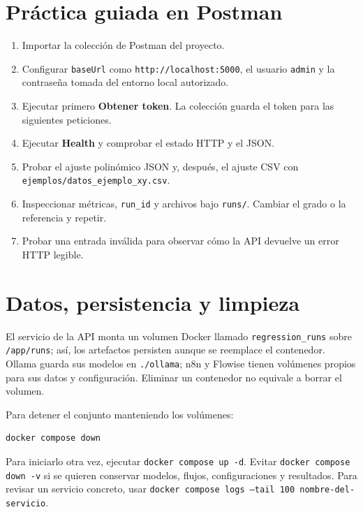 \documentclass[11pt,a4paper]{article}
\begin{document}
\section{Práctica guiada en Postman}
\begin{enumerate}
\item Importar la colección de Postman del proyecto.
\item Configurar \texttt{baseUrl} como \texttt{http://localhost:5000}, el usuario \texttt{admin} y la contraseña tomada del entorno local autorizado.
\item Ejecutar primero \textbf{Obtener token}. La colección guarda el token para las siguientes peticiones.
\item Ejecutar \textbf{Health} y comprobar el estado HTTP y el JSON.
\item Probar el ajuste polinómico JSON y, después, el ajuste CSV con \texttt{ejemplos/datos\_ejemplo\_xy.csv}.
\item Inspeccionar métricas, \texttt{run\_id} y archivos bajo \texttt{runs/}. Cambiar el grado o la referencia y repetir.
\item Probar una entrada inválida para observar cómo la API devuelve un error HTTP legible.
\end{enumerate}

\section{Datos, persistencia y limpieza}
El servicio de la API monta un volumen Docker llamado \texttt{regression\_runs} sobre \texttt{/app/runs}; así, los artefactos persisten aunque se reemplace el contenedor. Ollama guarda sus modelos en \texttt{./ollama}; n8n y Flowise tienen volúmenes propios para sus datos y configuración. Eliminar un contenedor no equivale a borrar el volumen.

Para detener el conjunto manteniendo los volúmenes:
\begin{lstlisting}
docker compose down
\end{lstlisting}
Para iniciarlo otra vez, ejecutar \texttt{docker compose up -d}. Evitar \texttt{docker compose down -v} si se quieren conservar modelos, flujos, configuraciones y resultados. Para revisar un servicio concreto, usar \texttt{docker compose logs --tail 100 nombre-del-servicio}.
\end{document}
